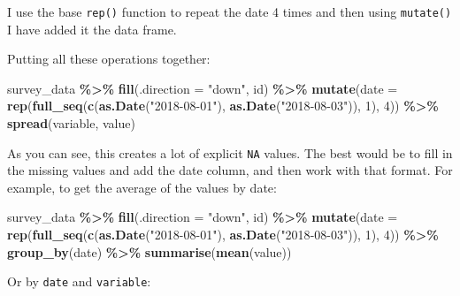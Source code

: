\documentclass[
]{article}
\newenvironment{Shaded}{\begin{snugshade}}{\end{snugshade}}
\newcommand{\DataTypeTok}[1]{\textcolor[rgb]{0.13,0.29,0.53}{#1}}
\newcommand{\DecValTok}[1]{\textcolor[rgb]{0.00,0.00,0.81}{#1}}
\newcommand{\KeywordTok}[1]{\textcolor[rgb]{0.13,0.29,0.53}{\textbf{#1}}}
\newcommand{\NormalTok}[1]{#1}
\newcommand{\OperatorTok}[1]{\textcolor[rgb]{0.81,0.36,0.00}{\textbf{#1}}}
\newcommand{\StringTok}[1]{\textcolor[rgb]{0.31,0.60,0.02}{#1}}
\begin{document}
I use the base \texttt{rep()} function to repeat the date 4 times and then using \texttt{mutate()} I have added
it the data frame.

Putting all these operations together:

\begin{Shaded}
\begin{Highlighting}[]
\NormalTok{survey\_data }\OperatorTok{\%\textgreater{}\%}
\StringTok{    }\KeywordTok{fill}\NormalTok{(}\DataTypeTok{.direction =} \StringTok{"down"}\NormalTok{, id) }\OperatorTok{\%\textgreater{}\%}
\StringTok{    }\KeywordTok{mutate}\NormalTok{(}\DataTypeTok{date =} \KeywordTok{rep}\NormalTok{(}\KeywordTok{full\_seq}\NormalTok{(}\KeywordTok{c}\NormalTok{(}\KeywordTok{as.Date}\NormalTok{(}\StringTok{"2018{-}08{-}01"}\NormalTok{), }\KeywordTok{as.Date}\NormalTok{(}\StringTok{"2018{-}08{-}03"}\NormalTok{)), }\DecValTok{1}\NormalTok{), }\DecValTok{4}\NormalTok{)) }\OperatorTok{\%\textgreater{}\%}
\StringTok{    }\KeywordTok{spread}\NormalTok{(variable, value)}
\end{Highlighting}
\end{Shaded}

As you can see, this creates a lot of explicit \texttt{NA} values. The best would be to fill in the missing
values and add the date column, and then work with that format. For example, to get the average
of the values by date:

\begin{Shaded}
\begin{Highlighting}[]
\NormalTok{survey\_data }\OperatorTok{\%\textgreater{}\%}
\StringTok{    }\KeywordTok{fill}\NormalTok{(}\DataTypeTok{.direction =} \StringTok{"down"}\NormalTok{, id) }\OperatorTok{\%\textgreater{}\%}
\StringTok{    }\KeywordTok{mutate}\NormalTok{(}\DataTypeTok{date =} \KeywordTok{rep}\NormalTok{(}\KeywordTok{full\_seq}\NormalTok{(}\KeywordTok{c}\NormalTok{(}\KeywordTok{as.Date}\NormalTok{(}\StringTok{"2018{-}08{-}01"}\NormalTok{), }\KeywordTok{as.Date}\NormalTok{(}\StringTok{"2018{-}08{-}03"}\NormalTok{)), }\DecValTok{1}\NormalTok{), }\DecValTok{4}\NormalTok{)) }\OperatorTok{\%\textgreater{}\%}
\StringTok{    }\KeywordTok{group\_by}\NormalTok{(date) }\OperatorTok{\%\textgreater{}\%}
\StringTok{    }\KeywordTok{summarise}\NormalTok{(}\KeywordTok{mean}\NormalTok{(value))}
\end{Highlighting}
\end{Shaded}

Or by \texttt{date} and \texttt{variable}:
\end{document}
